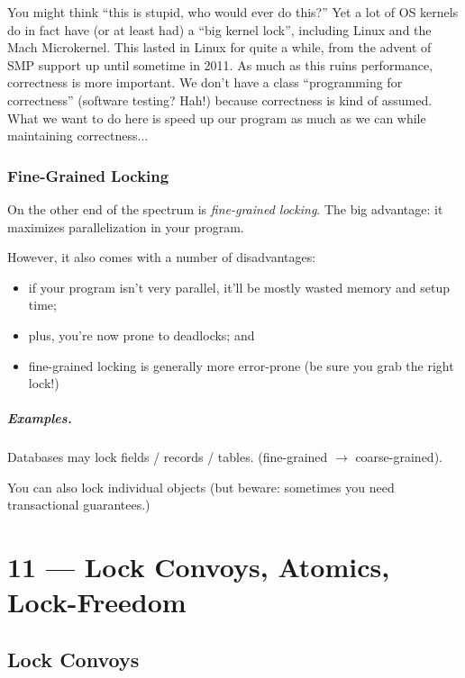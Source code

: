 \documentclass[a4paper]{report}
\begin{document}
You might think ``this is stupid, who would ever do this?'' Yet a lot of OS kernels do in fact have (or at least had) a ``big kernel lock'', including Linux and the Mach Microkernel. This lasted in Linux for quite a while, from the advent of SMP support up until sometime in 2011. As much as this ruins performance, correctness is more important. We don't have a class ``programming for correctness'' (software testing? Hah!) because correctness is kind of assumed. What we want to do here is speed up our program as much as we can while maintaining correctness...

\subsection*{Fine-Grained Locking}
On the other end of the spectrum is \emph{fine-grained locking}. The big
advantage: it maximizes parallelization in your program.

However, it also comes with a number of disadvantages:
  \begin{itemize}
    \item if your program isn't very parallel, it'll be mostly wasted memory and setup time;
    \item plus, you're now prone to deadlocks; and
    \item fine-grained locking is generally more error-prone (be sure you grab the right lock!)
  \end{itemize}

\paragraph{Examples.}

    Databases may lock fields / records / tables. (fine-grained $\rightarrow$ coarse-grained).

    You can also lock individual objects (but beware: sometimes you need transactional guarantees.)









\chapter*{11 --- Lock Convoys, Atomics, Lock-Freedom}


\section*{Lock Convoys}
\end{document}
